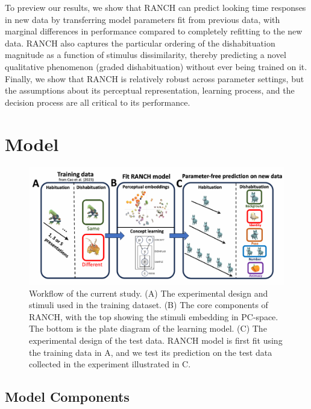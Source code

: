 \documentclass[10pt, letterpaper]{article}
\newenvironment{CodeChunk}{}{}
\begin{document}
To preview our results, we show that RANCH can predict looking time
responses in new data by transferring model parameters fit from previous
data, with marginal differences in performance compared to completely
refitting to the new data. RANCH also captures the particular ordering
of the dishabituation magnitude as a function of stimulus dissimilarity,
thereby predicting a novel qualitative phenomenon (graded
dishabituation) without ever being trained on it. Finally, we show that
RANCH is relatively robust across parameter settings, but the
assumptions about its perceptual representation, learning process, and
the decision process are all critical to its performance.

\hypertarget{model}{%
\section{Model}\label{model}}

\begin{CodeChunk}
\begin{figure}[h!]

{\centering \includegraphics{figs/design_fig-1} 

}

\caption[Workflow of the current study]{Workflow of the current study. (A) The experimental design and stimuli used in the training dataset. (B) The core components of RANCH, with the top showing the stimuli embedding in PC-space. The bottom is the plate diagram of the learning model. (C) The experimental design of the test data. RANCH model is first fit using the training data in A, and we test its prediction on the test data collected in the experiment illustrated in C.}\label{fig:design_fig}
\end{figure}
\end{CodeChunk}

\hypertarget{model-components}{%
\subsection{Model Components}\label{model-components}}
\end{document}
